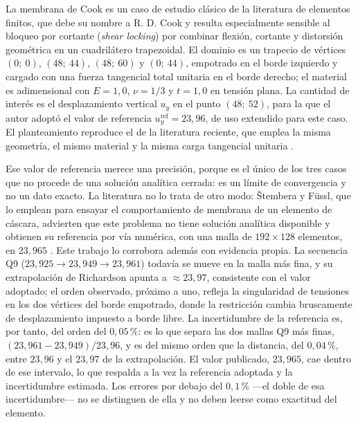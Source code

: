 La membrana de Cook es un caso de estudio clásico de la literatura de elementos finitos, que debe su nombre a R. D. Cook \autocite[p.~27]{stembera2019dkmq24} y resulta especialmente sensible al bloqueo por cortante (\emph{shear locking}) por combinar flexión, cortante y distorsión geométrica en un cuadrilátero trapezoidal. El dominio es un trapecio de vértices $(0;\ 0)$, $(48;\ 44)$, $(48;\ 60)$ y $(0;\ 44)$, empotrado en el borde izquierdo y cargado con una fuerza tangencial total unitaria en el borde derecho; el material es adimensional con $E = 1{,}0$, $\nu = 1/3$ y $t = 1{,}0$ en tensión plana. La cantidad de interés es el desplazamiento vertical $u_y$ en el punto $(48;\ 52)$, para la que el autor adoptó el valor de referencia $u_y^{\text{ref}} = 23{,}96$, de uso extendido para este caso. El planteamiento reproduce el de la literatura reciente, que emplea la misma geometría, el mismo material y la misma carga tangencial unitaria \autocite[p.~27]{stembera2019dkmq24}.

Ese valor de referencia merece una precisión, porque es el único de los tres casos que no procede de una solución analítica cerrada: es un límite de convergencia y no un dato exacto. La literatura no lo trata de otro modo: Štembera y Füssl, que lo emplean para ensayar el comportamiento de membrana de un elemento de cáscara, advierten que este problema no tiene solución analítica disponible y obtienen su referencia por vía numérica, con una malla de $192\times128$ elementos, en $23{,}965$ \autocite[p.~28]{stembera2019dkmq24}. Este trabajo lo corrobora además con evidencia propia. La secuencia Q9 ($23{,}925 \to 23{,}949 \to 23{,}961$) todavía se mueve en la malla más fina, y su extrapolación de Richardson \autocite[pp.~309-312]{oberkampf2010vv} apunta a $\approx 23{,}97$, consistente con el valor adoptado; el orden observado, próximo a uno, refleja la singularidad de tensiones en los dos vértices del borde empotrado, donde la restricción cambia bruscamente de desplazamiento impuesto a borde libre. La incertidumbre de la referencia es, por tanto, del orden del $0{,}05\,\%$: es lo que separa las dos mallas Q9 más finas, $(23{,}961-23{,}949)/23{,}96$, y es del mismo orden que la distancia, del $0{,}04\,\%$, entre $23{,}96$ y el $23{,}97$ de la extrapolación. El valor publicado, $23{,}965$, cae dentro de ese intervalo, lo que respalda a la vez la referencia adoptada y la incertidumbre estimada. Los errores por debajo del $0{,}1\,\%$ ---el doble de esa incertidumbre--- no se distinguen de ella y no deben leerse como exactitud del elemento.


